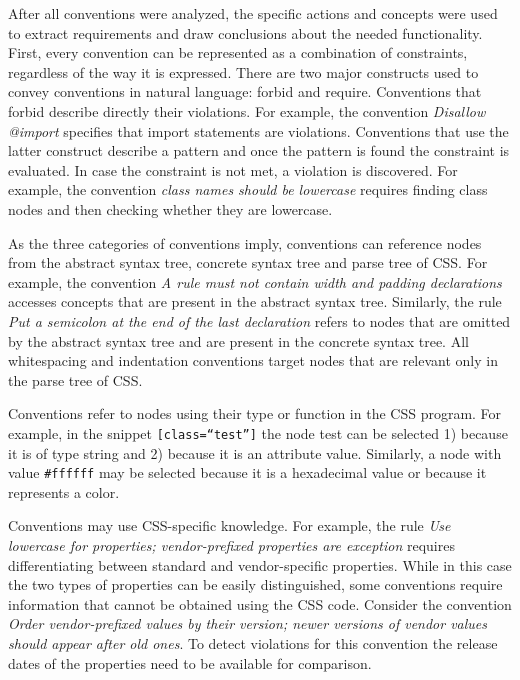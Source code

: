 \documentclass[parskip=full]{uvamscse}
\begin{document}
After all conventions were analyzed, the specific actions and concepts were used to extract
requirements and draw conclusions about the needed functionality. First, every convention can be
represented as a combination of constraints, regardless of the way it is expressed. There are two
major constructs used to convey conventions in natural language: forbid and require. Conventions
that forbid describe directly their violations. For example, the convention \textit{Disallow
@import} specifies that import statements are violations. Conventions that use the latter construct
describe a pattern and once the pattern is found the constraint is evaluated. In case the constraint
is not met, a violation is discovered. For example, the convention \textit{class names should be
lowercase} requires finding class nodes and then checking whether they are lowercase.

As the three categories of conventions imply, conventions can reference nodes from the abstract
syntax tree, concrete syntax tree and parse tree of CSS. For example, the convention \textit{A rule
must not contain width and padding declarations} accesses concepts that are present in the abstract
syntax tree. Similarly, the rule \textit{Put a semicolon at the end of the last declaration} refers
to nodes that are omitted by the abstract syntax tree and are present in the concrete syntax tree.
All whitespacing and indentation conventions target nodes that are relevant only in the parse tree
of CSS.

Conventions refer to nodes using their type or function in the CSS program. For example, in the
snippet \texttt{[class=``test'']} the node test can be selected 1) because it is of type string and
2) because it is an attribute value. Similarly, a node with value \texttt{\#ffffff} may be selected
because it is a hexadecimal value or because it represents a color.

Conventions may use CSS-specific knowledge. For example, the rule \textit{Use lowercase for
properties; vendor-prefixed properties are exception} requires differentiating between standard and
vendor-specific properties. While in this case the two types of properties can be easily
distinguished, some conventions require information that cannot be obtained using the CSS code.
Consider the convention \textit{Order vendor-prefixed values by their version; newer versions of
vendor values should appear after old ones}. To detect violations for this convention the release
dates of the properties need to be available for comparison.
\end{document}
